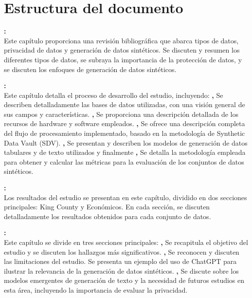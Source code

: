 \section{Estructura del documento}

\textbf{:}  \\
Este capítulo proporciona una revisión bibliográfica que abarca tipos de datos, privacidad de datos y generación de datos sintéticos. Se discuten y resumen los diferentes tipos de datos, se subraya la importancia de la protección de datos, y se discuten los enfoques de generación de datos sintéticos.

\textbf{:}  \\
Este capítulo detalla el proceso de desarrollo del estudio, incluyendo: 
\textbf{,} Se describen detalladamente las bases de datos utilizadas, con una visión general de sus campos y características. 
\textbf{,} Se proporciona una descripción detallada de los recursos de hardware y software empleados. 
\textbf{,} Se ofrece una descripción completa del flujo de procesamiento implementado, basado en la metodología de Synthetic Data Vault (SDV). 
\textbf{,} Se presentan y describen los modelos de generación de datos tabulares y de texto utilizados y finalmente
\textbf{,} Se detalla la metodología empleada para obtener y calcular las métricas para la evaluación de los conjuntos de datos sintéticos.

\textbf{:} \\
Los resultados del estudio se presentan en este capítulo, dividido en dos secciones principales: King County y Económicos. En cada sección, se discuten detalladamente los resultados obtenidos para cada conjunto de datos.

\textbf{:} \\
Este capítulo se divide en tres secciones principales: \textbf{,}
Se recapitula el objetivo del estudio y se discuten los hallazgos más significativos.
\textbf{,}
Se reconocen y discuten las limitaciones del estudio.
Se presenta un ejemplo del uso de ChatGPT para ilustrar la relevancia de la generación de datos sintéticos.
\textbf{,}
Se discute sobre los modelos emergentes de generación de texto y la necesidad de futuros estudios en esta área, incluyendo la importancia de evaluar la privacidad.
